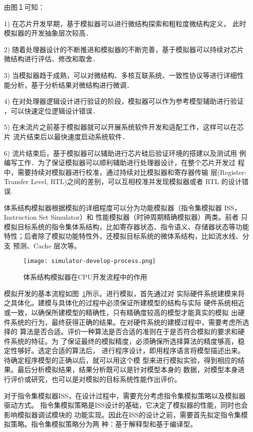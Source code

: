 由图１可知：


1) 在芯片开发早期，基于模拟器可以进行微结构探索和粗粒度微结构定义，
此时模拟器的开发抽象层次较高．


2) 随着处理器设计的不断推进和模拟器的不断完善，基于模拟器可以持续对芯片
微结构进行评估、修改和取舍．


3) 当模拟器趋于成熟，可以对微结构、多核互联系统、一致性协议等进行详细性
能分析，基于分析结果对微结构进行微调．


4) 在对处理器逻辑设计进行验证的阶段，模拟器可以作为参考模型辅助进行验证
，可以快速定位逻辑设计错误．


5) 在未流片之前基于模拟器就可以开展系统软件开发和适配工作，这样可以在芯片
流片结束后以最快速度启动系统软件．


6) 流片结束后，基于模拟器可以辅助进行芯片硅后验证环境的搭建以及测试用
例编写工作．为了保证模拟器可以顺利辅助进行处理器设计，在整个芯片开发过
程中，需要持续对模拟器进行校准，通过持续对比模拟器和寄存器传输
层(Register-Transfer Level, RTL)之间的差别，可以互相校准并发现模拟器或者 RTL
的设计错误.


体系结构模拟器根据模拟的详细程度可以分为功能模拟器（指令集模拟器 ISS，Instruction  Set  Simulator）和
性能模拟器（时钟周期精确模拟器）两类。前者
只模拟目标系统的指令集体系结构，比如寄存器状态、指令语义、存储器状态等功能
特性；后者除了模拟功能特性外，还模拟目标系统的微体系结构，比如流水线、分支
预测、Cache 层次等\cite{cachecengcideng}。
\begin{figure}[h]
  \centering
  \texttt{[image: simulator-develop-process.png]}
  \caption{体系结构模拟器在CPU开发流程中的作用}
  \label{fig:sim-dev-process}
\end{figure}



模拟开发的基本流程如图~\ref{fig:sim-dev-process}所示。进行模拟，首先通过对
实际硬件系统建模来将之具体化。建模与具体化的过程中必须保证所建模型的结构与实际
硬件系统相近或一致，以确保所建模型的精确性，只有精确度较高的模型才能真实的模拟
出硬件系统的行为，最终获得正确的结果。在对硬件系统的建模过程中，需要考虑所选择的
算法是否合适。评价一种算法是否合适的准则在于是否符合模拟的要求和硬件系统的特征。为
了保证最终的模拟精度，必须确保所选择算法的精度够高，稳定性够好。选定合适的算法后，
进行程序设计，即用程序语言将模型描述出来。待确定程序模型的正确以后，就可以用这个模
型来进行模拟实验，得到相应的结果。最后分析模拟结果，结果分析既可以是针对模型本身的
数据，对模型本身进行评价或研究，也可以是对模拟的目标系统性能作出评价。


对于指令集模拟器ISS，在设计过程中，需要充分考虑指令集模拟策略以及模拟器驱动方式。
指令集模拟策略是ISS设计的基础，它决定了模拟器的性能，同时也会影响模拟器调试模块的
功能实现。因此在ISS的设计之前，需要首先拟定指令集模拟策略。指令集模拟策略分为两
种：基于解释型和基于编译型。

